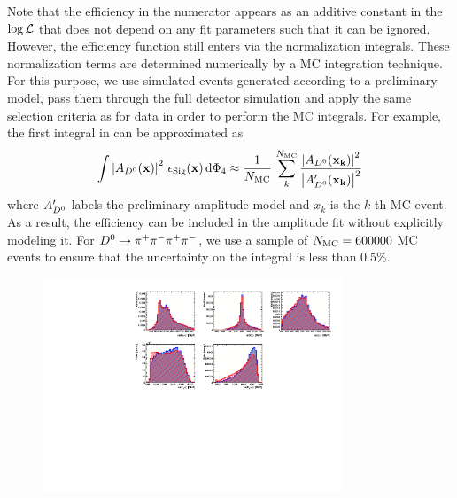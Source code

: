 Note that the efficiency in the numerator appears as an additive constant in the $\log {\cal L}$ that does not depend on any fit parameters such that it can be ignored.
However, the efficiency function still enters via the normalization integrals. 
These normalization terms are determined numerically by a MC integration technique.
For this purpose, we use simulated events generated according to a preliminary model, pass them 
through the full detector simulation and apply the same selection criteria as for data 
in order to perform the MC integrals.
For example, the first integral in  can be approximated as 
\begin{equation}
	\int \left\vert   A_{{{D}^0}}(\mathbf{x}) \right\vert^{2} \, \epsilon_{\rm Sig}(\mathbf{x}) \, \text{d}\Phi_{4}   \approx 
	\frac{1}{N_{\rm MC}} \, \sum_{k}^{N_{\rm MC}}    \frac{\left\vert   A_{{{D}^0}}(\bold{x_{k}}) \right\vert^{2}}
	{\left\vert A_{{{D}^0}}^{\prime}(\bold{x_{k}}) \right\vert^{2}}
\end{equation}
where $A_{{{D}^0}}^{\prime}$ labels the preliminary amplitude model and
$x_{k}$ is the $k$-th MC event. As a result, the efficiency can be included in the amplitude fit without explicitly modeling it.
For ${{D}^0} \rightarrow \pi^+ \pi^- {{\pi}^+} {{\pi}^-}$, we use a sample of $N_{\rm MC}  = 600 000$  MC events to 
ensure that the uncertainty on the integral is less than $0.5 \%$.



\begin{figure}[h]
\centering
\includegraphics[height=!,width=0.8\textwidth]{figs/AcceptancePhspBDT/variables_id_c1.pdf}
\caption{}
\label{fig:}
\end{figure}



